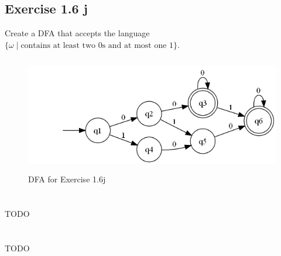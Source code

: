 \documentclass{article}
\newcommand{\where}{\mid}
\begin{document}
\subsection{Exercise 1.6 j}

Create a DFA that accepts the language $\{ \omega \where \text{contains at
least two 0s and at most one 1} \}$.

\begin{figure}[h!]
	\includegraphics[height=2.0in]{1_6_j.png}
	\caption{DFA for Exercise 1.6j}
\end{figure}

\section{}

TODO

\section{}

TODO
\end{document}
